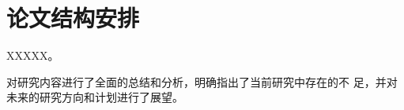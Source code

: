 \section{论文结构安排}
XXXXX。

对研究内容进行了全面的总结和分析\supercite{RIS-NOMA}，明确指出了当前研究中存在的不
足，并对未来的研究方向和计划进行了展望\cite{huiyi}。


































